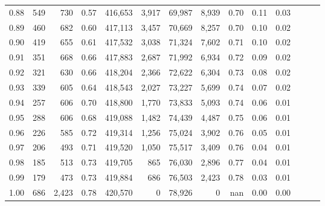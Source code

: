 \begin{tabular}{rrrrrrrrrrrrrr}
0.88 &     549 &    730 &  0.57 &  416,653 &    3,917 &  69,987 &   8,939 &  0.70 &  0.11 &      0.03 \\
0.89 &     460 &    682 &  0.60 &  417,113 &    3,457 &  70,669 &   8,257 &  0.70 &  0.10 &      0.02 \\
0.90 &     419 &    655 &  0.61 &  417,532 &    3,038 &  71,324 &   7,602 &  0.71 &  0.10 &      0.02 \\
0.91 &     351 &    668 &  0.66 &  417,883 &    2,687 &  71,992 &   6,934 &  0.72 &  0.09 &      0.02 \\
0.92 &     321 &    630 &  0.66 &  418,204 &    2,366 &  72,622 &   6,304 &  0.73 &  0.08 &      0.02 \\
0.93 &     339 &    605 &  0.64 &  418,543 &    2,027 &  73,227 &   5,699 &  0.74 &  0.07 &      0.02 \\
0.94 &     257 &    606 &  0.70 &  418,800 &    1,770 &  73,833 &   5,093 &  0.74 &  0.06 &      0.01 \\
0.95 &     288 &    606 &  0.68 &  419,088 &    1,482 &  74,439 &   4,487 &  0.75 &  0.06 &      0.01 \\
0.96 &     226 &    585 &  0.72 &  419,314 &    1,256 &  75,024 &   3,902 &  0.76 &  0.05 &      0.01 \\
0.97 &     206 &    493 &  0.71 &  419,520 &    1,050 &  75,517 &   3,409 &  0.76 &  0.04 &      0.01 \\
0.98 &     185 &    513 &  0.73 &  419,705 &      865 &  76,030 &   2,896 &  0.77 &  0.04 &      0.01 \\
0.99 &     179 &    473 &  0.73 &  419,884 &      686 &  76,503 &   2,423 &  0.78 &  0.03 &      0.01 \\
1.00 &     686 &  2,423 &  0.78 &  420,570 &        0 &  78,926 &       0 &   nan &  0.00 &      0.00 \\
\bottomrule
\end{tabular}
